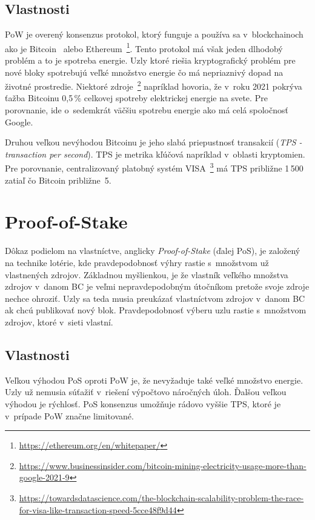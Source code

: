 \subsection{Vlastnosti}
PoW je overený konsenzus protokol, ktorý funguje a používa sa v~blockchainoch ako je Bitcoin~\cite{satoshiBitcoin} alebo Ethereum~\footnote{\url{https://ethereum.org/en/whitepaper/}}. Tento protokol má však jeden dlhodobý problém a to je spotreba energie. Uzly ktoré riešia kryptografický problém pre nové bloky spotrebujú veľké množstvo energie čo má nepriaznivý dopad na životné prostredie. Niektoré zdroje~\footnote{\url{https://www.businessinsider.com/bitcoin-mining-electricity-usage-more-than-google-2021-9}} napríklad hovoria, že v~roku 2021 pokrýva ťažba Bitcoinu 0,5\,\% celkovej spotreby elektrickej energie na svete. Pre porovnanie, ide o~sedemkrát väčšiu spotrebu energie ako má celá spoločnosť Google.~\cite{leporeConsensus}

Druhou veľkou nevýhodou Bitcoinu je jeho slabá priepustnosť transakcií (\textit{TPS - transaction per second}). TPS je metrika kľúčová napríklad v~oblasti kryptomien. Pre porovnanie, centralizovaný platobný systém VISA~\footnote{\url{https://towardsdatascience.com/the-blockchain-scalability-problem-the-race-for-visa-like-transaction-speed-5cce48f9d44}} má TPS približne 1\,500 zatiaľ čo Bitcoin približne~5.

\section{Proof-of-Stake}\label{sec:pos}

Dôkaz podielom na vlastníctve, anglicky \textit{Proof-of-Stake} (ďalej PoS), je založený na technike lotérie, kde pravdepodobnosť výhry rastie s~množstvom už vlastnených zdrojov. Základnou myšlienkou, je že vlastník veľkého množstva zdrojov v~danom BC je veľmi nepravdepodobným útočníkom pretože svoje zdroje nechce ohroziť. Uzly sa teda musia preukázať vlastníctvom zdrojov v~danom BC ak chcú publikovať nový blok. Pravdepodobnosť výberu uzlu rastie s~množstvom zdrojov, ktoré v~sieti vlastní.~\cite{homoliakBlockchain, nguyenPos}

\subsection{Vlastnosti}

Veľkou výhodou PoS oproti PoW je, že nevyžaduje také veľké množstvo energie. Uzly už nemusia súťažiť v~riešení výpočtovo náročných úloh. Ďalšou veľkou výhodou je rýchlosť. PoS konsenzus umožňuje rádovo vyššie TPS, ktoré je v~prípade PoW značne limitované.~\cite{leporeConsensus, nguyenPos}

